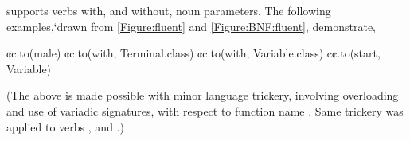 \Self supports verbs with, and without, noun parameters. 
The following examples,`drawn from \cref{Figure:fluent} and \cref{Figure:BNF:fluent},
  demonstrate, 
\begin{JAVA}
    ¢¢.to(male)
    ¢¢.to(with, Terminal.class)
    ¢¢.to(with, Variable.class)
    ¢¢.to(start, Variable)\end{JAVA}
(The above is made possible with minor \Java language trickery,
  involving overloading and use of variadic signatures,
  with respect to function name .
Same trickery was applied to verbs , and .)



  
